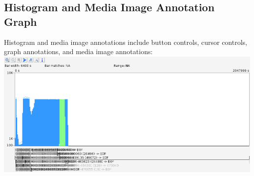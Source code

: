 \documentclass[11pt,fleqn]{article} %
\begin{document}
\subsection{Histogram and Media Image Annotation Graph}
Histogram and media image annotations include button controls, cursor controls, graph annotations, and media image annotations:\\
\includegraphics[scale=.4]{screenshots/histogram_and_annotation_graph}\\
\end{document}
